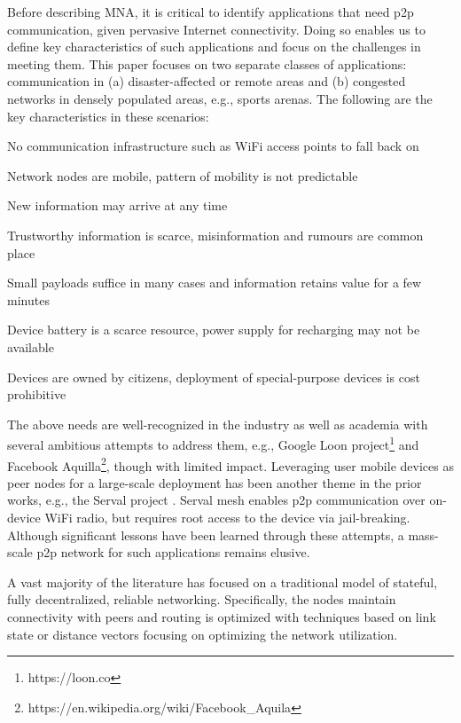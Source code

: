 \documentclass[conference]{IEEEtran}
\newcommand{\taskprefix}{CH}
\newcommand{\tasksize}{\normalsize}
\newenvironment{taskenv}[1]{\begin{list}{{\tasksize\sc \theenumi.}}{\usecounter{enumi}
      \settowidth{\labelwidth}{{\tasksize\sc \taskprefix#1-99}}
      \setlength{\leftmargin}{\labelwidth}
}}{\end{list}}
\newcounter{task}
\newcommand{\btask}{\begin{taskenv}{\taskprefix}\setcounter{enumi}{\value{task}}\renewcommand{\theenumi}{\taskprefix$_{\arabic{enumi}}$}}
\newcommand{\etask}{\setcounter{task}{\value{enumi}}\renewcommand{\theenumi}{\arabic{enumi}.}\end{taskenv}}
\begin{document}
Before describing MNA, it is critical to identify applications that
need p2p communication, given pervasive Internet connectivity. Doing
so enables us to define key characteristics of such applications and
focus on the challenges in meeting them.  This paper focuses on two
separate classes of applications: communication in
(a) disaster-affected or remote areas and (b) congested networks in
densely populated areas, e.g., sports arenas.  The following are the
key characteristics in these scenarios:

%
\btask
%
\item\label{c:0} No communication infrastructure such as WiFi
  access points to fall back on
\item\label{c:1} Network nodes are mobile, pattern of mobility is not
  predictable
\item\label{c:2} New information may arrive at any time
\item\label{c:3} Trustworthy information is scarce, misinformation and
  rumours are common place
\item\label{c:4}  Small payloads suffice in many cases and information
  retains value for a few minutes
\item\label{c:5}  Device battery is a scarce resource, power supply
  for recharging may not be available
\item\label{c:6}  Devices are owned by citizens, deployment of
  special-purpose devices is cost prohibitive
%
\etask
%

The above needs are well-recognized in the industry as well as
academia with several ambitious attempts to address them, e.g., Google
Loon project\footnote{https://loon.co} and Facebook
Aquilla\footnote{https://en.wikipedia.org/wiki/Facebook\_Aquila},
though with limited impact. Leveraging user mobile devices as peer
nodes for a large-scale deployment has been another theme in the prior
works, e.g., the Serval project
\cite{gardner-stephen-serval-2011}. Serval mesh enables p2p
communication over on-device WiFi radio, but requires root access to
the device via jail-breaking. Although significant lessons have been
learned through these attempts, a mass-scale p2p network for such
applications remains elusive.

A vast majority of the literature has focused on a traditional model
of stateful, fully decentralized, reliable networking. Specifically,
the nodes maintain connectivity with peers and routing is optimized
with techniques based on link state or distance vectors
\cite{clausen-olsr-2003,perkins-aodv-2003} focusing on optimizing the
network utilization.
\end{document}
